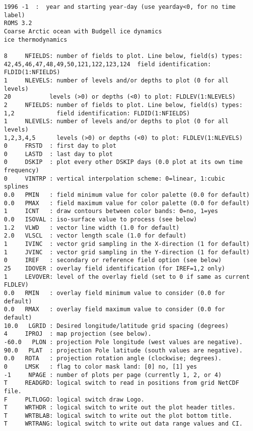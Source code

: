 \begin{verbatim}
1996 -1  :  year and starting year-day (use yearday<0, for no time label)
ROMS 3.2
Coarse Arctic ocean with Budgell ice dynamics
ice thermodynamics

8     NFIELDS: number of fields to plot. Line below, field(s) types:
42,45,46,47,48,49,50,121,122,123,124  field identification:
FLDID(1:NFIELDS)
1     NLEVELS: number of levels and/or depths to plot (0 for all levels)
20           levels (>0) or depths (<0) to plot: FLDLEV(1:NLEVELS)
2     NFIELDS: number of fields to plot. Line below, field(s) types:
1,2            field identification: FLDID(1:NFIELDS)
1     NLEVELS: number of levels and/or depths to plot (0 for all levels)
1,2,3,4,5      levels (>0) or depths (<0) to plot: FLDLEV(1:NLEVELS)
0     FRSTD  : first day to plot
0     LASTD  : last day to plot
0     DSKIP  : plot every other DSKIP days (0.0 plot at its own time frequency)
0     VINTRP : vertical interpolation scheme: 0=linear, 1:cubic splines
0.0   PMIN   : field minimum value for color palette (0.0 for default)
0.0   PMAX   : field maximum value for color palette (0.0 for default)
1     ICNT   : draw contours between color bands: 0=no, 1=yes
0.0   ISOVAL : iso-surface value to process (see below)
1.2   VLWD   : vector line width (1.0 for default)
2.0   VLSCL  : vector length scale (1.0 for default)
1     IVINC  : vector grid sampling in the X-direction (1 for default)
1     JVINC  : vector grid sampling in the Y-direction (1 for default)
0     IREF   : secondary or reference field option (see below)
25    IDOVER : overlay field identification (for IREF=1,2 only)
1     LEVOVER: level of the overlay field (set to 0 if same as current FLDLEV)
0.0   RMIN   : overlay field minimum value to consider (0.0 for default)
0.0   RMAX   : overlay field maximum value to consider (0.0 for default)
10.0   LGRID : Desired longitude/latitude grid spacing (degrees)
4     IPROJ  : map projection (see below).
-60.0   PLON : projection Pole longitude (west values are negative).
90.0   PLAT  : projection Pole latitude (south values are negative).
0.0   ROTA   : projection rotation angle (clockwise; degrees).
0     LMSK   : flag to color mask land: [0] no, [1] yes
-1     NPAGE : number of plots per page (currently 1, 2, or 4)  
T     READGRD: logical switch to read in positions from grid NetCDF file.
F     PLTLOGO: logical switch draw Logo.
T     WRTHDR : logical switch to write out the plot header titles.
T     WRTBLAB: logical switch to write out the plot bottom title.
T     WRTRANG: logical switch to write out data range values and CI.


\end{verbatim}
